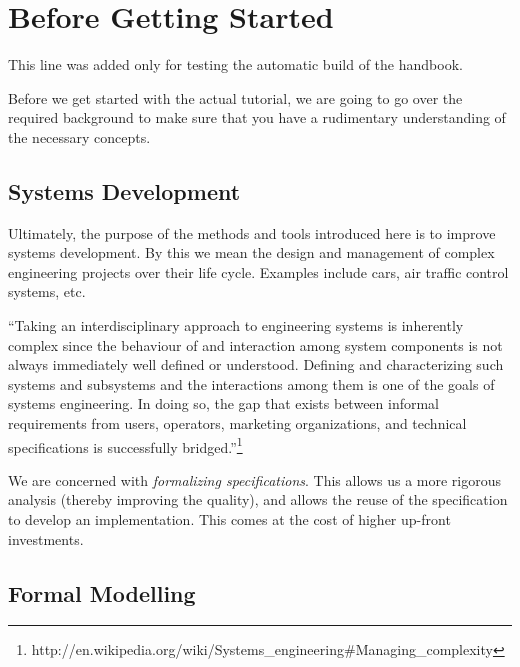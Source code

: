 \section{Before Getting Started}
\label{tutorial_1}

This line was added only for testing the automatic build of the handbook.

Before we get started with the actual tutorial, we are going to go over the required background to make sure that you have a rudimentary understanding of the necessary concepts.


\subsection{Systems Development}

Ultimately, the purpose of the methods and tools introduced here is to improve systems development.  By this we mean the design and management of complex engineering projects over their life cycle.  Examples include cars, air traffic control systems, etc.

``Taking an interdisciplinary approach to engineering systems is inherently complex since the behaviour of and interaction among system components is not always immediately well defined or understood. Defining and characterizing such systems and subsystems and the interactions among them is one of the goals of systems engineering. In doing so, the gap that exists between informal requirements from users, operators, marketing organizations, and technical specifications is successfully bridged.''\footnote{http://en.wikipedia.org/wiki/Systems\_engineering\#Managing\_complexity}

We are concerned with \textit{formalizing specifications}.  This allows us a more rigorous analysis (thereby improving the quality), and allows the reuse of the specification to develop an implementation.  This comes at the cost of higher up-front investments.

\subsection{Formal Modelling}




